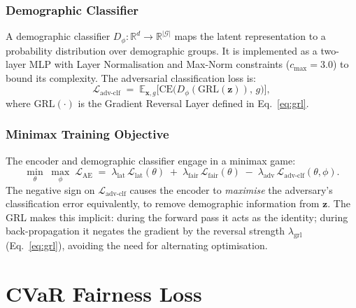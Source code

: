 \subsubsection{Demographic Classifier}
\label{subsec:dem_clf}
 
A demographic classifier $D_\phi : \mathbb{R}^d \to \mathbb{R}^{|\mathcal{G}|}$ maps the latent representation to a probability distribution over demographic groups.  It is implemented as a two-layer MLP with Layer Normalisation and Max-Norm constraints ($c_{\max} = 3.0$) to bound its complexity.  The adversarial classification loss is:
\begin{equation}
  \mathcal{L}_{\mathrm{adv\text{-}clf}}
  \;=\;
  \mathbb{E}_{\mathbf{x},g}\!\bigl[
    \mathrm{CE}\!\bigl(D_\phi(\mathrm{GRL}(\mathbf{z})),\, g\bigr)
  \bigr],
  \label{eq:adv_clf}
\end{equation}
where $\mathrm{GRL}(\cdot)$ is the Gradient Reversal Layer defined in Eq.~\ref{eq:grl}.
 
\subsubsection{Minimax Training Objective}
\label{subsec:minimax}
 
The encoder and demographic classifier engage in a minimax game:
\begin{equation}
  \min_{\theta}\;\max_{\phi}\;
  \mathcal{L}_{\mathrm{AE}}
  \;=\;
  \lambda_{\mathrm{lat}}\,\mathcal{L}_{\mathrm{lat}}(\theta)
  \;+\;
  \lambda_{\mathrm{fair}}\,\mathcal{L}_{\mathrm{fair}}(\theta)
  \;-\;
  \lambda_{\mathrm{adv}}\,\mathcal{L}_{\mathrm{adv\text{-}clf}}(\theta,\phi).
  \label{eq:minimax}
\end{equation}
The negative sign on $\mathcal{L}_{\mathrm{adv\text{-}clf}}$ causes the encoder to \emph{maximise} the adversary's classification error equivalently, to remove demographic information from $\mathbf{z}$.  The GRL makes this implicit: during the forward pass it acts as the identity; during back-propagation it negates the gradient by the reversal strength $\lambda_{\mathrm{grl}}$ (Eq.~\ref{eq:grl}),  avoiding the need for alternating optimisation.

 
\section{CVaR Fairness Loss}
\label{sec:cvar_fair}
 
